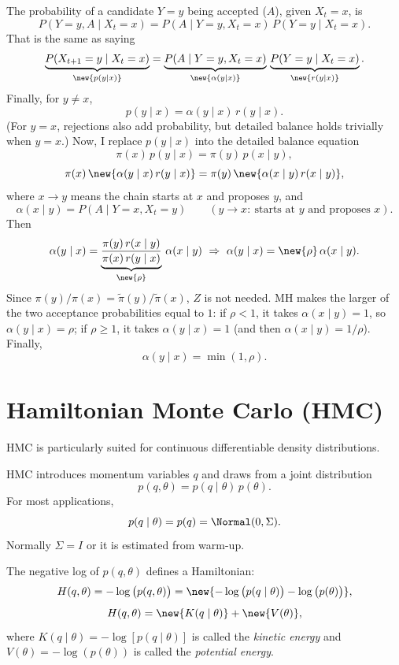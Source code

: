 The probability of a candidate $Y = y$ being accepted ($A$), given $X_t = x$, is
\[
P(Y = y, A \mid X_t = x) = P(A \mid Y = y, X_t = x)\,P(Y = y \mid X_t = x).
\]
That is the same as saying
\[
\underbrace{P(X_{t+1} = y \mid X_t = x)}_{\new{p(y \mid x)}} = \underbrace{P(A \mid Y = y, X_t = x)}_{\new{\alpha(y \mid x)}}\,\underbrace{P(Y = y \mid X_t = x)}_{\new{r(y \mid x)}}.
\]
Finally, for $y \neq x$,
\[
p(y \mid x) = \alpha(y \mid x)\,r(y \mid x).
\]
(For $y = x$, rejections also add probability, but detailed balance holds trivially when $y = x$.)
Now, I replace $p(y \mid x)$ into the detailed balance equation
\[
\pi(x)\,p(y \mid x) = \pi(y)\,p(x \mid y),
\]
\[
\pi(x)\,\new{\alpha(y \mid x)\,r(y \mid x)} = \pi(y)\,\new{\alpha(x \mid y)\,r(x \mid y)},
\]
where $x \to y$ means the chain starts at $x$ and proposes $y$, and
\[
\alpha(x \mid y) = P(A \mid Y = x, X_t = y) \qquad (y \to x:\ \text{starts at } y \text{ and proposes } x).
\]
Then
\[
\alpha(y \mid x) = \underbrace{\frac{\pi(y)\,r(x \mid y)}{\pi(x)\,r(y \mid x)}}_{\new{\rho}}\,\alpha(x \mid y)
\ \Rightarrow\
\alpha(y \mid x) = \new{\rho}\,\alpha(x \mid y).
\]
Since $\pi(y)/\pi(x) = \tilde\pi(y)/\tilde\pi(x)$, $Z$ is not needed. MH makes the larger of the two acceptance probabilities equal to $1$: if $\rho < 1$, it takes $\alpha(x \mid y) = 1$, so $\alpha(y \mid x) = \rho$; if $\rho \ge 1$, it takes $\alpha(y \mid x) = 1$ (and then $\alpha(x \mid y) = 1/\rho$). Finally,
\[
\alpha(y \mid x) = \min(1, \rho).
\]

\section{Hamiltonian Monte Carlo (HMC)}
HMC is particularly suited for continuous differentiable density distributions.

HMC introduces momentum variables $q$ and draws from a joint distribution
\[
p(q, \theta) = p(q \mid \theta)\,p(\theta).
\]
For most applications,
\[
p(q \mid \theta) = p(q) = \Normal(0, \Sigma).
\]
Normally $\Sigma = I$ or it is estimated from warm-up.

The negative log of $p(q, \theta)$ defines a Hamiltonian:
\[
H(q, \theta) = -\log\big(p(q, \theta)\big) = \new{-\log\big(p(q \mid \theta)\big) - \log\big(p(\theta)\big)},
\]
\[
H(q, \theta) = \new{K(q \mid \theta)} + \new{V(\theta)},
\]
where $K(q \mid \theta) = -\log[p(q \mid \theta)]$ is called the \emph{kinetic energy} and $V(\theta) = -\log(p(\theta))$ is called the \emph{potential energy}.


